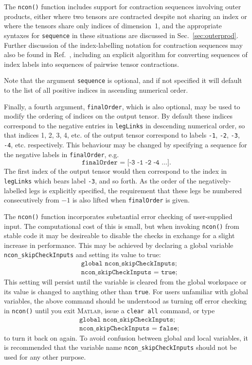 \documentclass[aps,prb,reprint,superscriptaddress,amsmath,amsfonts]{revtex4-1}
\theoremstyle{definition}
\newcommand{\aref}[1]{Sec.~\ref{#1}}
\newcommand{\rcite}[1]{Ref.~\onlinecite{#1}}
\newcommand{\MATLAB}{\textsc{Matlab}}
\newcommand{\ttt}[1]{\texttt{#1}}
\begin{document}
The \ttt{ncon()} function includes support for contraction sequences involving outer products, either where two tensors are contracted despite not sharing an index or where the tensors share only indices of dimension~1, and the appropriate syntaxes for \ttt{sequence} in these situations are discussed in \aref{sec:outerprod}. 
Further discussion of the index-labelling notation for contraction sequences may also be found in \rcite{pfeifer2013a},
including an explicit
algorithm for converting sequences of index labels into sequences of pairwise tensor contractions.

Note that the argument \ttt{sequence} is optional, and if not specified it will default to the list of all positive indices in ascending numerical order. 

Finally, a fourth argument, \ttt{finalOrder}, which is also optional, may be used to modify the ordering of indices on the output tensor. By default these indices correspond to the negative entries in \ttt{legLinks} in descending numerical order, so that indices 1, 2, 3, 4, etc. of the output tensor correspond to labels \ttt{-1}, \ttt{-2}, \ttt{-3}, \ttt{-4}, etc. respectively. This behaviour may be changed by specifying a sequence for the negative labels in \ttt{finalOrder}, e.g.
\begin{equation*}
\ttt{finalOrder = [-3 -1 -2 -4 \ldots]}. 
\end{equation*}
The first index of the output tensor would then correspond to the index in \ttt{legLinks} which bears label \ttt{-3}, and so forth. As the order of the negatively-labelled legs is explicitly specified, the requirement that these legs be numbered consecutively from $-1$ is also lifted when \ttt{finalOrder} is given.

The \ttt{ncon()} function incorporates substantial error checking of user-supplied input. The computational cost of this is small, but when invoking \ttt{ncon()} from stable code it may be desireable to disable the checks in exchange for a slight increase in performance. This may be achieved by declaring a global variable \ttt{ncon\_skipCheckInputs} and setting its value to true:
\begin{align*}
&\ttt{global ncon\_skipCheckInputs;}\\
&\ttt{ncon\_skipCheckInputs = true;}
\end{align*}
This setting will persist until the variable is cleared from the global workspace or its value is changed to anything other than \ttt{true}. For users unfamiliar with global variables, the above command should be understood as turning off error checking in \ttt{ncon()} until you exit \MATLAB{}, issue a \ttt{clear all} command, or type
\begin{align*}
&\ttt{global ncon\_skipCheckInputs;}\\
&\ttt{ncon\_skipCheckInputs = false;}
\end{align*}
to turn it back on again. To avoid confusion between global and local variables, it is recommended that the variable name \ttt{ncon\_skipCheckInputs} should not be used for any other purpose.
\end{document}
